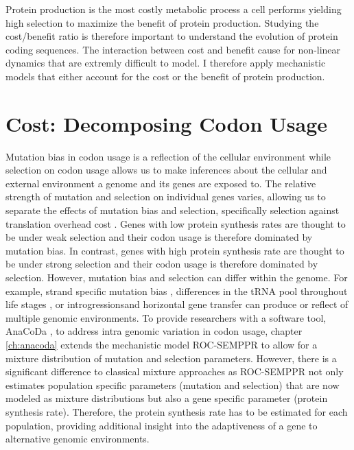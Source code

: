 Protein production is the most costly metabolic process a cell performs \citep{buttgereit1995,warner1999,AkashiAndGojobori2002,lindqvist2018} yielding high selection to maximize the benefit of protein production.
Studying the cost/benefit ratio is therefore important to understand the evolution of protein coding sequences.
The interaction between cost and benefit cause for non-linear dynamics that are extremly difficult to model.
I therefore apply mechanistic models that either account for the cost or the benefit of protein production.


\section{Cost: Decomposing Codon Usage}

Mutation bias in codon usage is a reflection of the cellular environment while selection on codon usage allows us to make inferences about the cellular and external environment a genome and its genes are exposed to.
The relative strength of mutation and selection on individual genes varies, allowing us to separate the effects of mutation bias and selection, specifically selection against translation overhead cost \citep{gilchrist2007,ShahAndGilchrist2011,gilchrist2015}.
Genes with low protein synthesis rates are thought to be under weak selection and their codon usage is therefore dominated by mutation bias.
In contrast, genes with high protein synthesis rate are thought to be under strong selection and their codon usage is therefore dominated by selection.
However, mutation bias and selection can differ within the genome.
For example, strand specific mutation bias \citep{Lafay1999,Romero2000}, differences in the tRNA pool throughout life stages \citep{sagi2016}, or introgressionsand horizontal gene transfer \citep{medigue1991,lawrence1997} can produce or reflect of multiple genomic environments.
To provide researchers with a software tool, AnaCoDa \cite{landerer2018}, to address intra genomic variation in codon usage, chapter \ref{ch:anacoda} extends the mechanistic model ROC-SEMPPR \cite{gilchrist2015} to allow for a mixture distribution of mutation and selection parameters.
However, there is a significant difference to classical mixture approaches as ROC-SEMPPR not only estimates population specific parameters (mutation and selection) that are now modeled as mixture distributions but also a gene specific parameter (protein synthesis rate). 
Therefore, the protein synthesis rate has to be estimated for each population, providing additional insight into the adaptiveness of a gene to alternative genomic environments.

